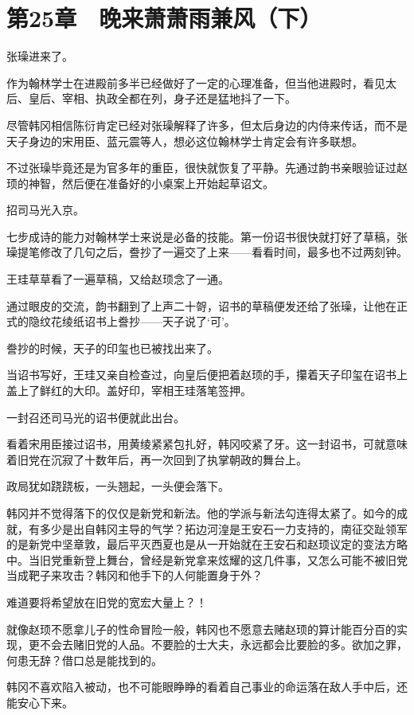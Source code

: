 \section{第25章　晚来萧萧雨兼风（下）}

张璪进来了。

作为翰林学士在进殿前多半已经做好了一定的心理准备，但当他进殿时，看见太后、皇后、宰相、执政全都在列，身子还是猛地抖了一下。

尽管韩冈相信陈衍肯定已经对张璪解释了许多，但太后身边的内侍来传话，而不是天子身边的宋用臣、蓝元震等人，想必这位翰林学士肯定会有许多联想。

不过张璪毕竟还是为官多年的重臣，很快就恢复了平静。先通过韵书亲眼验证过赵顼的神智，然后便在准备好的小桌案上开始起草诏文。

招司马光入京。

七步成诗的能力对翰林学士来说是必备的技能。第一份诏书很快就打好了草稿，张璪提笔修改了几句之后，誊抄了一遍交了上来——看看时间，最多也不过两刻钟。

王珪草草看了一遍草稿，又给赵顼念了一通。

通过眼皮的交流，韵书翻到了上声二十哿，诏书的草稿便发还给了张璪，让他在正式的隐纹花绫纸诏书上誊抄——天子说了‘可’。

誊抄的时候，天子的印玺也已被找出来了。

当诏书写好，王珪又亲自检查过，向皇后便把着赵顼的手，攥着天子印玺在诏书上盖上了鲜红的大印。盖好印，宰相王珪落笔签押。

一封召还司马光的诏书便就此出台。

看着宋用臣接过诏书，用黄绫紧紧包扎好，韩冈咬紧了牙。这一封诏书，可就意味着旧党在沉寂了十数年后，再一次回到了执掌朝政的舞台上。

政局犹如跷跷板，一头翘起，一头便会落下。

韩冈并不觉得落下的仅仅是新党和新法。他的学派与新法勾连得太紧了。如今的成就，有多少是出自韩冈主导的气学？拓边河湟是王安石一力支持的，南征交趾领军的是新党中坚章敦，最后平灭西夏也是从一开始就在王安石和赵顼议定的变法方略中。当旧党重新登上舞台，曾经是新党拿来炫耀的这几件事，又怎么可能不被旧党当成靶子来攻击？韩冈和他手下的人何能置身于外？

难道要将希望放在旧党的宽宏大量上？！

就像赵顼不愿拿儿子的性命冒险一般，韩冈也不愿意去赌赵顼的算计能百分百的实现，更不会去赌旧党的人品。不要脸的士大夫，永远都会比要脸的多。欲加之罪，何患无辞？借口总是能找到的。

韩冈不喜欢陷入被动，也不可能眼睁睁的看着自己事业的命运落在敌人手中后，还能安心下来。

